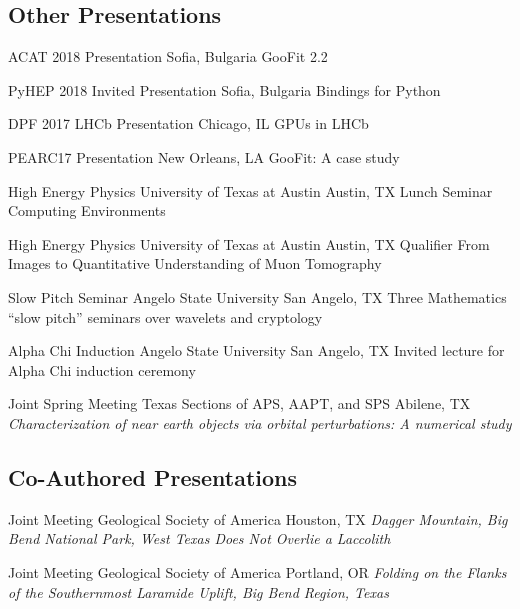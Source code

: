\documentclass[10pt,letterpaper,english]{moderncv}
\begin{document}
\subsection{Other Presentations}

{ACAT 2018}
{Presentation}
{Sofia, Bulgaria}
{GooFit 2.2}

{PyHEP 2018}
{Invited Presentation}
{Sofia, Bulgaria}
{Bindings for Python}

{DPF 2017}
{LHCb Presentation}
{Chicago, IL}
{GPUs in LHCb}

{PEARC17}
{Presentation}
{New Orleans, LA}
{GooFit: A case study}


{High Energy Physics}
{University of Texas at Austin}
{Austin, TX}
{Lunch Seminar}%
{Computing Environments}

{High Energy Physics}
{University of Texas at Austin}
{Austin, TX}
{Qualifier}%
{From Images to Quantitative Understanding of Muon Tomography}

{Slow Pitch Seminar}
{Angelo State University}
{San Angelo, TX}
{Three Mathematics ``slow pitch'' seminars over wavelets and cryptology}

{Alpha Chi Induction}
{Angelo State University}
{San Angelo, TX}
{Invited lecture for Alpha Chi induction ceremony}

{Joint Spring Meeting}
{Texas Sections of APS, AAPT, and SPS}
{Abilene, TX}
{\emph{Characterization of near earth objects via orbital perturbations: A numerical study}} %


\subsection{Co-Authored Presentations}

{Joint Meeting}
{Geological Society of America}
{Houston, TX}
{\emph{Dagger Mountain, Big Bend National Park, West Texas Does Not Overlie a Laccolith}}

{Joint Meeting}
{Geological Society of America}
{Portland, OR}
{\emph{Folding on the Flanks of the Southernmost Laramide Uplift, Big Bend Region, Texas}}

\end{document}
